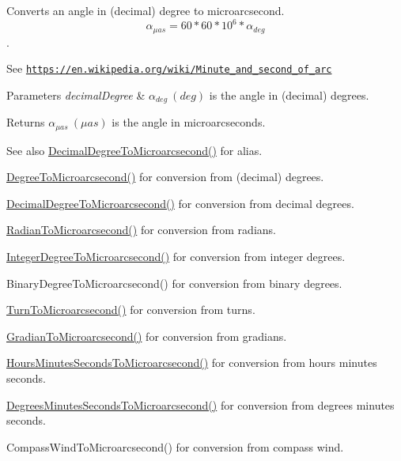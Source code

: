 Converts an angle in (decimal) degree to microarcsecond. \[\alpha_{\mu as}=60 * 60 * 10^6 * \alpha_{deg}\]. 

See \href{https://en.wikipedia.org/wiki/Minute_and_second_of_arc}{\tt https\+://en.\+wikipedia.\+org/wiki/\+Minute\+\_\+and\+\_\+second\+\_\+of\+\_\+arc} 
\begin{DoxyParams}{Parameters}
{\em decimal\+Degree} & $\alpha_{deg}\ (deg)$ is the angle in (decimal) degrees. \\
\hline
\end{DoxyParams}
\begin{DoxyReturn}{Returns}
$\alpha_{\mu as}\ (\mu as)$ is the angle in microarcseconds. 
\end{DoxyReturn}
\begin{DoxySeeAlso}{See also}
\mbox{\hyperlink{group___e_g_x_math-_conversions-_angle_conversions-_decimal_degree_ga6fa88456069907fd24716fa575517571}{Decimal\+Degree\+To\+Microarcsecond()}} for alias. 

\mbox{\hyperlink{group___e_g_x_math-_conversions-_angle_conversions-_degree_ga31b65388fe1b4656663b3d66b9d764e6}{Degree\+To\+Microarcsecond()}} for conversion from (decimal) degrees. 

\mbox{\hyperlink{group___e_g_x_math-_conversions-_angle_conversions-_decimal_degree_ga6fa88456069907fd24716fa575517571}{Decimal\+Degree\+To\+Microarcsecond()}} for conversion from decimal degrees. 

\mbox{\hyperlink{group___e_g_x_math-_conversions-_angle_conversions-_radian_ga3a515ca2838a305fa40750763f546a86}{Radian\+To\+Microarcsecond()}} for conversion from radians. 

\mbox{\hyperlink{group___e_g_x_math-_conversions-_angle_conversions-_integer_degree_ga69179d6082764595c7014805e1f6b31e}{Integer\+Degree\+To\+Microarcsecond()}} for conversion from integer degrees. 

Binary\+Degree\+To\+Microarcsecond() for conversion from binary degrees. 

\mbox{\hyperlink{group___e_g_x_math-_conversions-_angle_conversions-_turn_ga41a861a04d65aab05647b32142e6d80d}{Turn\+To\+Microarcsecond()}} for conversion from turns. 

\mbox{\hyperlink{group___e_g_x_math-_conversions-_angle_conversions-_gradian_gab7781c860ea3ab9c9cf76ab639846a07}{Gradian\+To\+Microarcsecond()}} for conversion from gradians. 

\mbox{\hyperlink{group___e_g_x_math-_conversions-_angle_conversions-_hours_minutes_seconds_ga061e4fa10d73e459d5f411cfe436bbe3}{Hours\+Minutes\+Seconds\+To\+Microarcsecond()}} for conversion from hours minutes seconds. 

\mbox{\hyperlink{group___e_g_x_math-_conversions-_angle_conversions-_degrees_minutes_seconds_gabc4de7934e776de13953707344a4da88}{Degrees\+Minutes\+Seconds\+To\+Microarcsecond()}} for conversion from degrees minutes seconds. 

Compass\+Wind\+To\+Microarcsecond() for conversion from compass wind. 
\end{DoxySeeAlso}
